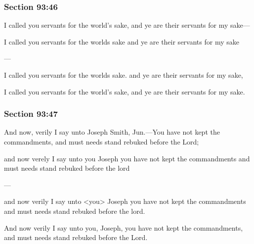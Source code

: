 	\subsubsection{Section 93:46} %
		\label{DC93-46}

		I called you servants for the world's sake, and ye are their servants for my sake---

		\begin{framed}
		\scriptsize
			\begin{compactdesc}
				\item[JSP] I called you servants for the worlds sake and ye are their servants for my sake
				\item[BC] ---
				\item[RB2] I called you servants for the worlds sake. and ye are their servants for my sake, 
				\item[RB1] I called you servants for the world's sake, and ye are their servants for my sake. 
			\end{compactdesc}
		\end{framed}

	\subsubsection{Section 93:47} %
		\label{DC93-47}

		And now, verily I say unto Joseph Smith, Jun.---You have not kept the commandments, and must needs stand rebuked before the Lord;

		\begin{framed}
		\scriptsize
			\begin{compactdesc}
				\item[JSP] and now verely I say unto you Joseph you have not kept the commandments and must needs stand rebuked before the lord
				\item[BC] ---
				\item[RB2] and now verily I say unto <you> Joseph you have not kept the commandments and must needs stand rebuked before the lord. 
				\item[RB1] And now verily I say unto you, Joseph, you have not kept the commandments, and must needs stand rebuked before the Lord. 
			\end{compactdesc}
		\end{framed}

